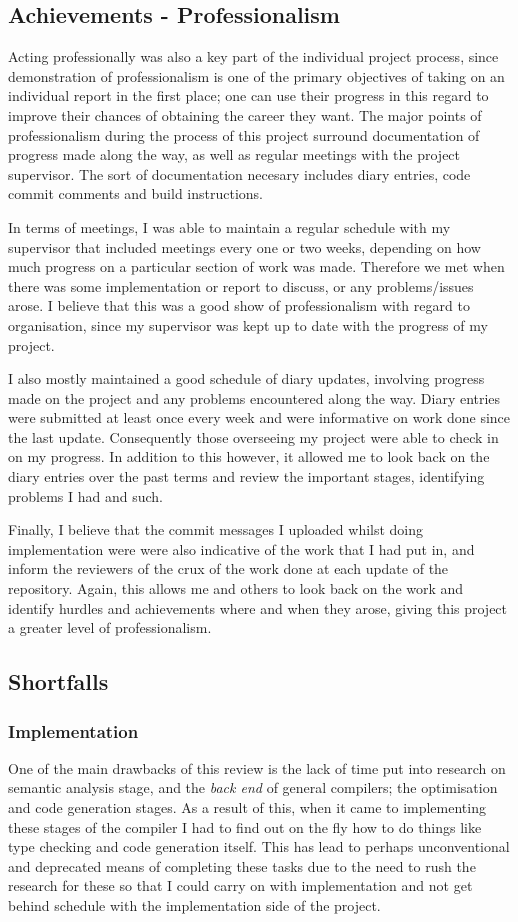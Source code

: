 \documentclass[a4paper, 11pt]{article}
\begin{document}
\subsection{Achievements - Professionalism}
Acting professionally was also a key part of the individual project process, since demonstration of professionalism is one of the primary objectives of taking on an individual report in the first place; one can use their progress in this regard to improve their chances of obtaining the career they want. The major points of professionalism during the process of this project surround documentation of progress made along the way, as well as regular meetings with the project supervisor. The sort of documentation necesary includes diary entries, code commit comments and build instructions. 

In terms of meetings, I was able to maintain a regular schedule with my supervisor that included meetings every one or two weeks, depending on how much progress on a particular section of work was made. Therefore we met when there was some implementation or report to discuss, or any problems/issues arose. I believe that this was a good show of professionalism with regard to organisation, since my supervisor was kept up to date with the progress of my project. 

I also mostly maintained a good schedule of diary updates, involving progress made on the project and any problems encountered along the way. Diary entries were submitted at least once every week and were informative on work done since the last update. Consequently those overseeing my project were able to check in on my progress. In addition to this however, it allowed me to look back on the diary entries over the past terms and review the important stages, identifying problems I had and such.

Finally, I believe that the commit messages I uploaded whilst doing implementation were were also indicative of the work that I had put in, and inform the reviewers of the crux of the work done at each update of the repository. Again, this allows me and others to look back on the work and identify hurdles and achievements where and when they arose, giving this project a greater level of professionalism.

\subsection{Shortfalls}
\subsubsection{Implementation}
One of the main drawbacks of this review is the lack of time put into research on semantic analysis stage, and the \textit{back end} of general compilers; the optimisation and code generation stages. As a result of this, when it came to implementing these stages of the compiler I had to find out on the fly how to do things like type checking and code generation itself. This has lead to perhaps unconventional and deprecated means of completing these tasks due to the need to rush the research for these so that I could carry on with implementation and not get behind schedule with the implementation side of the project. 
\end{document}
